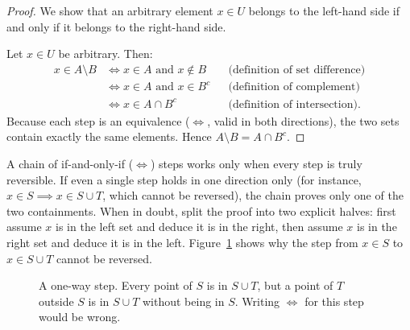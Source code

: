 \begin{proof}
We show that an arbitrary element $x \in U$ belongs to the left-hand side if and only if it belongs to the right-hand side.

Let $x \in U$ be arbitrary. Then:
\begin{align*}
x \in A \setminus B 
&\iff x \in A \text{ and } x \notin B && \text{(definition of set difference)} \\
&\iff x \in A \text{ and } x \in B^c && \text{(definition of complement)} \\
&\iff x \in A \cap B^c && \text{(definition of intersection)}.
\end{align*}
Because each step is an equivalence ($\Longleftrightarrow$, valid in both directions), the two sets contain exactly the same elements. Hence $A \setminus B = A \cap B^c$.
\end{proof}

\begin{trapbox}
A chain of if-and-only-if ($\Longleftrightarrow$) steps works only when every step is truly reversible. If even a single step holds in one direction only (for instance, $x \in S \implies x \in S \cup T$, which cannot be reversed), the chain proves only one of the two containments. When in doubt, split the proof into two explicit halves: first assume $x$ is in the left set and deduce it is in the right, then assume $x$ is in the right set and deduce it is in the left. Figure~\ref{11:fig-one-way-step} shows why the step from $x \in S$ to $x \in S \cup T$ cannot be reversed.
\end{trapbox}

\begin{figure}[htbp]
\centering
{}
\caption{A one-way step. Every point of $S$ is in $S \cup T$, but a point of $T$ outside $S$ is in $S \cup T$ without being in $S$. Writing $\Longleftrightarrow$ for this step would be wrong.}
\label{11:fig-one-way-step}
\end{figure}

